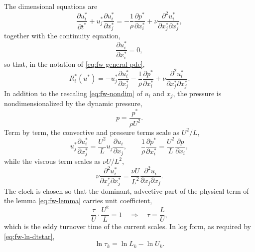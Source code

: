 The dimensional equations are
\begin{equation}\label{eq:ns-momentum}
  \frac{\partial u_i^*}{\partial t^*} + u_j^* \frac{\partial u_i^*}{\partial x_j^*}= -\frac{1}{\rho}\frac{\partial p^*}{\partial x_i^*} + \nu \frac{\partial^2 u_i^*}{\partial x_j^* \partial x_j^*},
\end{equation}
together with the continuity equation,
\begin{equation}\label{eq:ns-continuity}
  \frac{\partial u_i^*}{\partial x_i^*} = 0,
\end{equation}
so that, in the notation of \eqref{eq:fw-general-pde},
\begin{equation}\label{eq:ns-R}
  R_i^*(u^*) = - u_j^* \frac{\partial u_i^*}{\partial x_j^*}
  - \frac{1}{\rho}\frac{\partial p^*}{\partial x_i^*}
  + \nu \frac{\partial^2 u_i^*}{\partial x_j^* \partial x_j^*}.
\end{equation}
In addition to the rescaling \eqref{eq:fw-nondim} of $u_i$ and $x_j$, the
pressure is nondimensionalized by the dynamic pressure,
\begin{equation}\label{eq:ns-pressure-nondim}
  p = \frac{p^*}{\rho U^2}.
\end{equation}
Term by term, the convective and pressure terms scale as $U^2/L$,
\begin{equation}\label{eq:ns-convection}
  u_j^* \frac{\partial u_i^*}{\partial x_j^*} = \frac{U^2}{L} u_j \frac{\partial u_i}{\partial x_j},
  \qquad
  \frac{1}{\rho}\frac{\partial p^*}{\partial x_i^*} = \frac{U^2}{L} \frac{\partial p}{\partial x_i},
\end{equation}
while the viscous term scales as $\nu U / L^2$,
\begin{equation}\label{eq:ns-viscous}
  \nu \frac{\partial^2 u_i^*}{\partial x_j^* \partial x_j^*} = \frac{\nu U}{L^2}\frac{\partial^2 u_i}{\partial x_j \partial x_j}.
\end{equation}
The clock is chosen so that the dominant, advective part of the physical term
of the lemma \eqref{eq:fw-lemma} carries unit coefficient,
\begin{equation}\label{eq:ns-clock}
  \frac{\tau}{U} \cdot \frac{U^2}{L} = 1
  \quad\Longrightarrow\quad
  \tau = \frac{L}{U},
\end{equation}
which is the eddy turnover time of the current scales. In log form, as
required by \eqref{eq:fw-ln-dtstar},
\begin{equation}\label{eq:ns-ln-clock}
  \ln \tau_k = \ln L_k - \ln U_k .
\end{equation}
